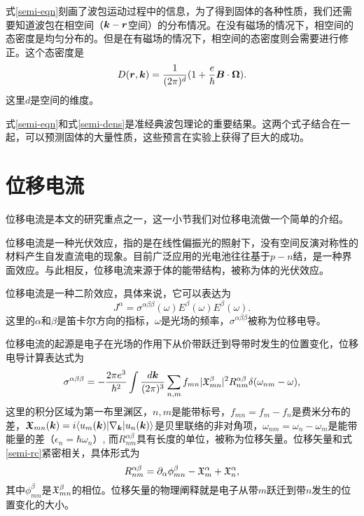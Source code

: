 式\ref{semi-eqn}刻画了波包运动过程中的信息，为了得到固体的各种性质，我们还需要知道波包在相空间（$\boldsymbol{k}-\boldsymbol{r}$空间）的分布情况。在没有磁场的情况下，相空间的态密度是均匀分布的。但是在有磁场的情况下，相空间的态密度则会需要进行修正。这个态密度是
\begin{equation}
D(\boldsymbol{r},\boldsymbol{k})=\frac{1}{(2\pi)^d}(1+\frac{e}{\hbar}\boldsymbol{B}\cdot\boldsymbol{\Omega}).\label{semi-dens}
\end{equation}
这里$d$是空间的维度。

式\ref{semi-eqn}和式\ref{semi-dens}是准经典波包理论的重要结果。这两个式子结合在一起，可以预测固体的大量性质，这些预言在实验上获得了巨大的成功。

\section{位移电流}

位移电流是本文的研究重点之一，这一小节我们对位移电流做一个简单的介绍。

位移电流是一种光伏效应，指的是在线性偏振光的照射下，没有空间反演对称性的材料产生自发直流电的现象。目前广泛应用的光电池往往基于$p-n$结，是一种界面效应。与此相反，位移电流来源于体的能带结构，被称为体的光伏效应。

位移电流是一种二阶效应，具体来说，它可以表达为
\begin{equation}
J^\alpha = \sigma^{\alpha\beta\beta}(\omega) E^\beta(\omega) E^\beta(\omega).
\end{equation}
这里的$\alpha$和$\beta$是笛卡尔方向的指标，$\omega$是光场的频率，$\sigma^{\alpha\beta\beta}$被称为位移电导。

位移电流的起源是电子在光场的作用下从价带跃迁到导带时发生的位置变化，位移电导计算表达式为
\begin{equation}
\sigma^{\alpha\beta\beta}=-\frac{2\pi e^3}{\hbar^2}\int \frac{d\boldsymbol{k}}{(2\pi)^3}\sum_{n,m}f_{mn}|\mathfrak{X}^\beta_{mn}|^2 R_{nm}^{\alpha\beta} \delta(\omega_{nm}-\omega),\label{shift-expr}
\end{equation}
这里的积分区域为第一布里渊区，$n,m$是能带标号，$f_{mn}=f_m-f_n$是费米分布的差，$\boldsymbol{\mathfrak{X}}_{mn}(\boldsymbol{k})=i \langle u_m(\boldsymbol{k})|\nabla_{\boldsymbol{k}}|u_n(\boldsymbol{k}) \rangle$是贝里联络的非对角项，$\omega_{nm}=\omega_n-\omega_m$是能带能量的差（$\epsilon_n=\hbar\omega_n$）, 而$R_{nm}^{\alpha\beta}$具有长度的单位，被称为位移矢量。位移矢量和式\ref{semi-rc}紧密相关，具体形式为
\begin{equation}
R_{nm}^{\alpha\beta}=\partial_\alpha \phi_{mn}^{\beta}-\mathfrak{X}_m^\alpha+\mathfrak{X}_n^\alpha,
\end{equation}
其中$\phi_{mn}^{\beta}$是$\mathfrak{X}_{mn}^{\beta}$的相位。位移矢量的物理阐释就是电子从带$m$跃迁到带$n$发生的位置变化的大小。

